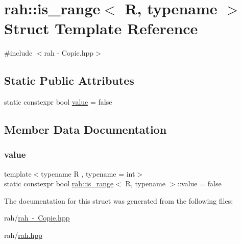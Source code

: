 \hypertarget{structrah_1_1is__range}{}\section{rah\+::is\+\_\+range$<$ R, typename $>$ Struct Template Reference}
\label{structrah_1_1is__range}


{\ttfamily \#include $<$rah -\/ Copie.\+hpp$>$}

\subsection*{Static Public Attributes}
\begin{DoxyCompactItemize}
\item 
static constexpr bool \mbox{\hyperlink{structrah_1_1is__range_a9ef44dfe2bfc6e750dea075e823d7f15}{value}} = false
\end{DoxyCompactItemize}


\subsection{Member Data Documentation}
\mbox{\label{structrah_1_1is__range_a9ef44dfe2bfc6e750dea075e823d7f15}} 
\subsubsection{\texorpdfstring{value}{value}}
{\footnotesize\ttfamily template$<$typename R , typename  = int$>$ \\
static constexpr bool \mbox{\hyperlink{structrah_1_1is__range}{rah\+::is\+\_\+range}}$<$ R, typename $>$\+::value = false\hspace{0.3cm}{\ttfamily [static]}}



The documentation for this struct was generated from the following files\+:\begin{DoxyCompactItemize}
\item 
rah/\mbox{\hyperlink{rah_01-_01_copie_8hpp}{rah -\/ Copie.\+hpp}}\item 
rah/\mbox{\hyperlink{rah_8hpp}{rah.\+hpp}}\end{DoxyCompactItemize}
